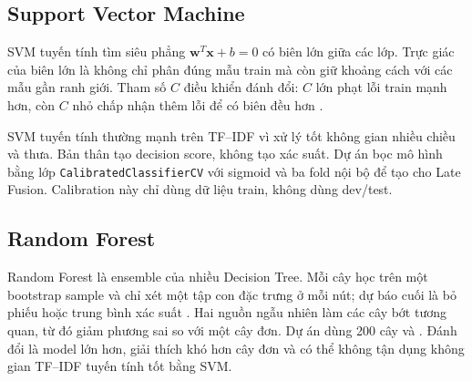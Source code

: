 \subsection{Support Vector Machine}

SVM tuyến tính tìm siêu phẳng \(\mathbf{w}^{T}\mathbf{x}+b=0\) có biên lớn giữa
các lớp. Trực giác của biên lớn là không chỉ phân đúng mẫu train mà còn giữ
khoảng cách với các mẫu gần ranh giới. Tham số \(C\) điều khiển đánh đổi:
\(C\) lớn phạt lỗi train mạnh hơn, còn \(C\) nhỏ chấp nhận thêm lỗi để có biên
đều hơn \cite{cortes1995}.

SVM tuyến tính thường mạnh trên TF--IDF vì xử lý tốt không gian nhiều chiều và
thưa. Bản thân  tạo decision score, không tạo xác suất. Dự án
bọc mô hình bằng lớp \texttt{CalibratedClassifier}\allowbreak\texttt{CV} với
sigmoid và ba fold nội bộ để
tạo  cho Late Fusion. Calibration này chỉ dùng dữ liệu
train, không dùng dev/test.

\subsection{Random Forest}

Random Forest là ensemble của nhiều Decision Tree. Mỗi cây học trên một bootstrap
sample và chỉ xét một tập con đặc trưng ở mỗi nút; dự báo cuối là bỏ phiếu hoặc
trung bình xác suất \cite{breiman2001}. Hai nguồn ngẫu nhiên làm các cây bớt
tương quan, từ đó giảm phương sai so với một cây đơn. Dự án dùng 200 cây và
. Đánh đổi là model lớn hơn, giải thích khó hơn cây
đơn và có thể không tận dụng không gian TF--IDF tuyến tính tốt bằng SVM.


